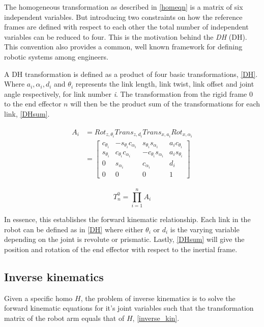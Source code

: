 The homogeneous transformation as described in \eqref{homeqn} is a matrix of six independent variables. But introducing two constraints on how the reference frames are defined with respect to each other the total number of independent variables can be reduced to four. This is the motivation behind the \textit{\gls{DH}} (DH). This convention also provides a common, well known framework for defining robotic systems among engineers.

A DH transformation is defined as a product of four basic transformations, \eqref{DH}. Where $a_i, \alpha_i, d_i $ and $\theta_i$ represents the link length, link twist, link offset and joint angle respectively, for link number \textit{i}. The transformation from the rigid frame $0$ to the end effector $n$ will then be the product sum of the transformations for each link, \eqref{DHsum}.

\begin{align}\label{DH}
\begin{split}
A_i &= Rot_{z,\theta_i}Trans_{z,d_i}Trans_{x,a_i}Rot_{x,\alpha_i} \\
&= \begin{bmatrix}
c_{\theta_i} & -s_{\theta_i}c_{\alpha_i} & s_{\theta_i}s_{\alpha_i} & a_{i}c_{\theta_i} \\ 
s_{\theta_i} & c_{\theta_i}c_{\alpha_i} & -c_{\theta_i}s_{\alpha_i} & a_{i}s_{\theta_i} \\ 
0 & s_{\alpha_i} & c_{\alpha_i} & d_i \\ 
0 & 0 & 0 & 1 
\end{bmatrix}
\end{split}
\end{align}

\begin{equation}\label{DHsum}
T^0_n=\prod_{i=1}^{n}A_i
\end{equation}

In essence, this establishes the forward kinematic relationship. Each link in the robot can be defined as in \eqref{DH} where either $\theta_i$ or $d_i$ is the varying variable depending on the joint is revolute or prismatic. Lastly, \eqref{DHsum} will give the position and rotation of the end effector with respect to the inertial frame.

\subsection{Inverse kinematics}

Given a specific \gls{homo} $H$, the problem of inverse kinematics is to solve the forward kinematic equations for it's joint variables such that the transformation matrix of the robot arm equals that of $H$, \eqref{inverse_kin}.

